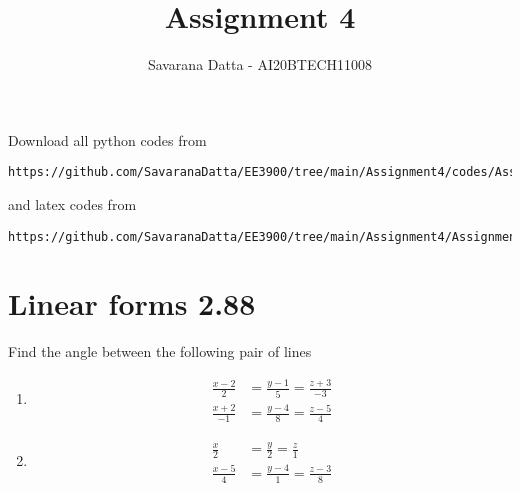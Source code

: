 \documentclass[journal,12pt,twocolumn]{IEEEtran}
\begin{document}
     \def\rightbox#1{\makebox[0in][r]{#1}}
     \def\centbox#1{\makebox[0in]{#1}}
     \def\topbox#1{\raisebox{-\baselineskip}[0in][0in]{#1}}
     \def\midbox#1{\raisebox{-0.5\baselineskip}[0in][0in]{#1}}
\vspace{3cm}
\title{ Assignment 4}
\author{Savarana Datta - AI20BTECH11008}
\maketitle
\newpage
\bigskip
\renewcommand{\thefigure}{\theenumi}
\renewcommand{\thetable}{\theenumi}
Download all python codes from 
\begin{lstlisting}
https://github.com/SavaranaDatta/EE3900/tree/main/Assignment4/codes/Assingment4.py
\end{lstlisting}
%
and latex codes from 
%
\begin{lstlisting}
https://github.com/SavaranaDatta/EE3900/tree/main/Assignment4/Assignment4.tex
\end{lstlisting}


\section{Linear forms 2.88}
Find the angle between the following pair of lines
\begin{enumerate}[label=\alph*)]
    \item 
    \begin{align}
        \frac{x-2}{2}&=\frac{y-1}{5}=\frac{z+3}{-3}\\
       \frac{x+2}{-1}&=\frac{y-4}{8}=\frac{z-5}{4}
    \end{align}
    \item
    \begin{align}
        \frac{x}{2}&=\frac{y}{2}=\frac{z}{1}\\
        \frac{x-5}{4}&=\frac{y-4}{1}=\frac{z-3}{8}
    \end{align}
\end{enumerate}
\end{document}
